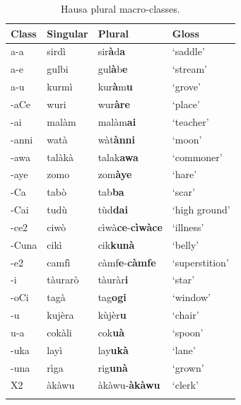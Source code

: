 \begin{table}[!htpb]
  \centering
  \begin{tabular}{llll}
    \lsptoprule
    Class & Singular & Plural                          & Gloss          \\
    \midrule
    a-a   & sirdì    & sir\textbf{à}d\textbf{a}        & `saddle'       \\
    a-e   & gulbi    & gul\textbf{à}b\textbf{e}        & `stream'       \\
    a-u   & kurmì    & kur\textbf{à}m\textbf{u}        & `grove'        \\
    -aCe  & wuri     & wur\textbf{àre}                 & `place'        \\
    -ai   & malàm    & malàm\textbf{ai}                & `teacher'      \\
    -anni & watà     & wàt\textbf{ànni}                & `moon'         \\
    -awa  & talàkà   & talak\textbf{awa}               & `commoner'     \\
    -aye  & zomo     & zom\textbf{àye}                 & `hare'         \\
    -Ca   & tabò     & tab\textbf{ba}                  & `scar'         \\
    -Cai  & tudù     & tùd\textbf{dai}                 & `high ground'  \\
    -ce2  & ciwò     & cìwà\textbf{ce}-\textbf{cìwàce} & `illness'      \\
    -Cuna & cikì     & cik\textbf{kunà}                & `belly'        \\
    -e2   & camfì    & càmf\textbf{e}-\textbf{càmfe}   & `superstition' \\
    -i    & tàurarò  & tàuràr\textbf{i}                & `star'         \\
    -oCi  & tagà     & tag\textbf{ogi}                 & `window'       \\
    -u    & kujèra   & kùjèr\textbf{u}                 & `chair'        \\
    u-a   & cokàli   & cok\textbf{uà}                  & `spoon'        \\
    -uka  & layì     & lay\textbf{ukà}                 & `lane'         \\
    -una  & rìga     & rig\textbf{unà}                 & `grown'        \\
    X2    & àkàwu    & àkàwu-\textbf{àkàwu}            & `clerk'        \\
    \lspbottomrule
  \end{tabular}
  \caption{Hausa plural macro-classes.} \label{tab:macro-hausa}
\end{table}

